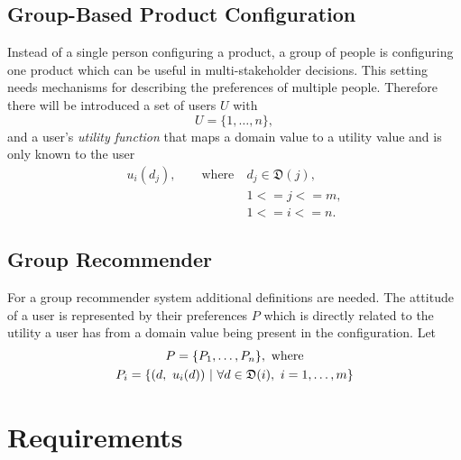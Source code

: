 \subsection{Group-Based Product Configuration}
\label{sec:Foundations:GroupBasedProductConfiguration}

Instead of a single person configuring a product, a group of people is configuring one product which can be useful in multi-stakeholder decisions. This setting needs mechanisms for describing the preferences of multiple people. Therefore there will be introduced a set of users $U$ with
\begin{equation}\label{eq:Foundations:ProductConfiguration:Users}
    U = \{1, \dotsc, n\},
\end{equation}
and a user's \emph{utility function} that maps a domain value to a utility value and is only known to the user
\begin{equation}
    \begin{split}
        u_i(d_j), \qquad \text{where}\ & d_j \in  \mathfrak{D}(j),\\
        & 1 <= j <= m, \\
        & 1 <= i <= n .
    \end{split}
\end{equation}

\subsection{Group Recommender}

For a group recommender system additional definitions are needed. The attitude of a user is represented by their preferences $P$ which is directly related to the utility a user has from a domain value being present in the configuration. Let 
\begin{gather} \label{tab:Foundations:GroupRecommenderSystem:Preferences}
    P = \{ P_1, \dotsc, P_n\},\ \text{where} \\
    P_i = \{(d,\ u_i(d)) \ | \ \forall d \in \mathfrak{D}(i),\ i=1,\dotsc,m \} \notag
\end{gather}


\section{Requirements}
\label{sec:Concept:Requirements}


